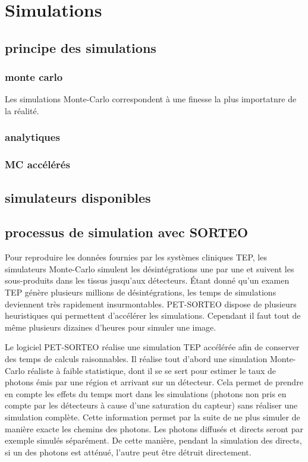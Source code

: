 \chapter{Simulations}
	\section{principe des simulations}
		\subsection{monte carlo}

Les simulations Monte-Carlo correspondent à une finesse la plus importatnre de la réalité.


		\subsection{analytiques}
		\subsection{MC accélérés}

	\section{simulateurs disponibles}



	\section{processus de simulation avec SORTEO}

Pour reproduire les données fournies par les systèmes cliniques TEP, les simulateurs Monte-Carlo simulent les désintégrations une par une et suivent les sous-produits dans les tissus jusqu'aux détecteurs. Étant donné qu'un examen TEP génère plusieurs millions de désintégrations, les temps de simulations deviennent très rapidement insurmontables. PET-SORTEO dispose de plusieurs heuristiques qui permettent d'accélérer les simulations. Cependant il faut tout de même plusieurs dizaines d'heures pour simuler une image.

Le logiciel PET-SORTEO réalise une simulation TEP accélérée afin de conserver des temps de calculs raisonnables. Il réalise tout d'abord une simulation Monte-Carlo réaliste à faible statistique, dont il se se sert pour estimer le taux de photons émis par une région et arrivant sur un détecteur. Cela permet de prendre en compte les effets du temps mort dans les simulations (photons non pris en compte par les détecteurs à cause d'une saturation du capteur) sans réaliser une simulation complète. Cette information permet par la suite de ne plus simuler de manière exacte les chemins des photons. Les photons diffusés et directs seront par exemple simulés séparément. De cette manière, pendant la simulation des directs, si un des photons est atténué, l'autre peut être détruit directement.

